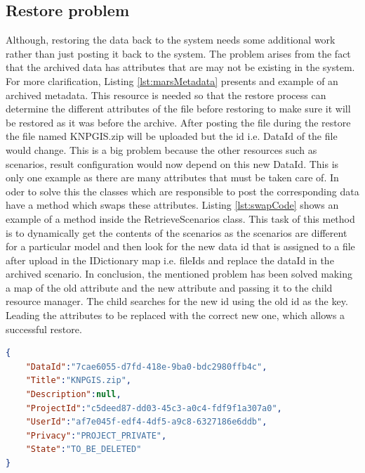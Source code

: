 \subsection{Restore problem}
Although, restoring the data back to the system needs some additional work rather than just posting it back to the system. The problem
arises from the fact that the archived data has attributes that are may not be existing in the system. For more clarification, Listing \ref{lst:marsMetadata} 
presents and example of an archived metadata. This resource is needed so that the restore process can determine the different attributes of the file
before restoring to make sure it will be restored as it was before the archive. After posting the file during the restore the file named KNPGIS.zip will 
be uploaded but the id i.e. DataId of the file would change. This is a big problem because the other resources such as scenarios, result configuration would now
depend on this new DataId. This is only one example as there are many attributes that must be taken care of. In oder to solve this the classes which are responsible
to post the corresponding data have a method which swaps these attributes. Listing \ref{lst:swapCode} shows an example of a method inside the RetrieveScenarios class.
This task of this method is to dynamically get the contents of the scenarios as the scenarios are different for a particular model and then look for the new data id
that is assigned to a file after upload in the IDictionary map i.e. fileIds and replace the dataId in the archived scenario. In conclusion, the mentioned problem
has been solved making a map of the old attribute and the new attribute and passing it to the child resource manager. The child searches for the new id using the 
old id as the key. Leading the attributes to be replaced with the correct new one, which allows a successful restore.

\par

\begin{lstlisting}[caption={Archived MARS metadata resource}, language=json,firstnumber=1, captionpos=b, label={lst:marsMetadata}]
{
    "DataId":"7cae6055-d7fd-418e-9ba0-bdc2980ffb4c",
    "Title":"KNPGIS.zip",
    "Description":null,
    "ProjectId":"c5deed87-dd03-45c3-a0c4-fdf9f1a307a0",
    "UserId":"af7e045f-edf4-4df5-a9c8-6327186e6ddb",
    "Privacy":"PROJECT_PRIVATE",
    "State":"TO_BE_DELETED"
}
\end{lstlisting}

